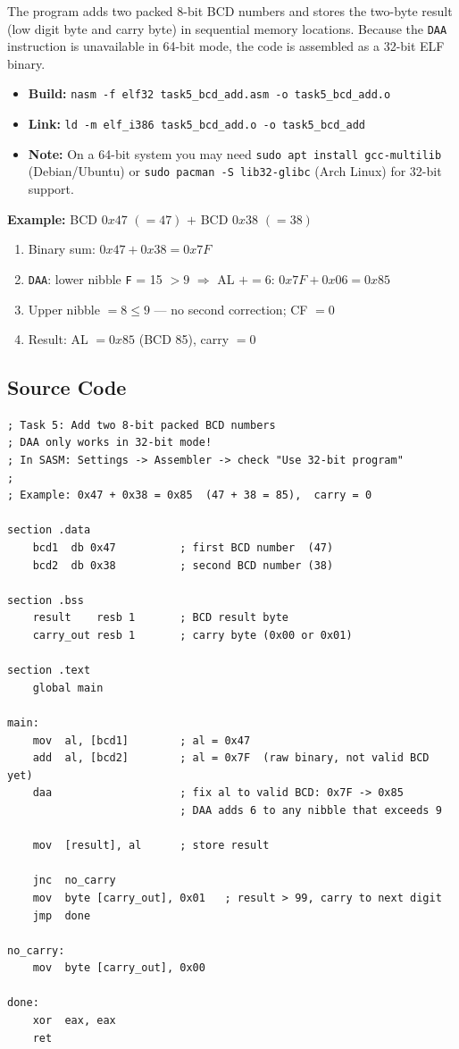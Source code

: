 \documentclass[12pt,a4paper]{article}
\begin{document}
The program adds two packed 8-bit BCD numbers and stores the two-byte result (low digit
byte and carry byte) in sequential memory locations.  Because the \texttt{DAA} instruction
is unavailable in 64-bit mode, the code is assembled as a 32-bit ELF binary.

\begin{itemize}
    \renewcommand{\labelitemi}{--}
    \item \textbf{Build:} \texttt{nasm -f elf32 task5\_bcd\_add.asm -o task5\_bcd\_add.o}
    \item \textbf{Link:} \texttt{ld -m elf\_i386 task5\_bcd\_add.o -o task5\_bcd\_add}
    \item \textbf{Note:} On a 64-bit system you may need \texttt{sudo apt install gcc-multilib}
    (Debian/Ubuntu) or \texttt{sudo pacman -S lib32-glibc} (Arch Linux) for 32-bit support.
\end{itemize}

\textbf{Example:} BCD $0x47$ $(=47)$ $+$ BCD $0x38$ $(=38)$

\begin{enumerate}
    \item Binary sum: $0x47 + 0x38 = 0x7F$
    \item \texttt{DAA}: lower nibble \texttt{F} = 15 $> 9$ $\Rightarrow$ AL $\mathrel{+}= 6$:
    $0x7F + 0x06 = 0x85$
    \item Upper nibble $= 8 \leq 9$ --- no second correction; CF $= 0$
    \item Result: AL $= 0x85$ (BCD 85), carry $= 0$
\end{enumerate}

\subsection{Source Code}

\begin{lstlisting}[caption={task5\_bcd\_add.asm --- Add two 8-bit BCD numbers}]
; Task 5: Add two 8-bit packed BCD numbers
; DAA only works in 32-bit mode!
; In SASM: Settings -> Assembler -> check "Use 32-bit program"
;
; Example: 0x47 + 0x38 = 0x85  (47 + 38 = 85),  carry = 0

section .data
    bcd1  db 0x47          ; first BCD number  (47)
    bcd2  db 0x38          ; second BCD number (38)

section .bss
    result    resb 1       ; BCD result byte
    carry_out resb 1       ; carry byte (0x00 or 0x01)

section .text
    global main

main:
    mov  al, [bcd1]        ; al = 0x47
    add  al, [bcd2]        ; al = 0x7F  (raw binary, not valid BCD yet)
    daa                    ; fix al to valid BCD: 0x7F -> 0x85
                           ; DAA adds 6 to any nibble that exceeds 9

    mov  [result], al      ; store result

    jnc  no_carry
    mov  byte [carry_out], 0x01   ; result > 99, carry to next digit
    jmp  done

no_carry:
    mov  byte [carry_out], 0x00

done:
    xor  eax, eax
    ret
\end{lstlisting}
\end{document}

